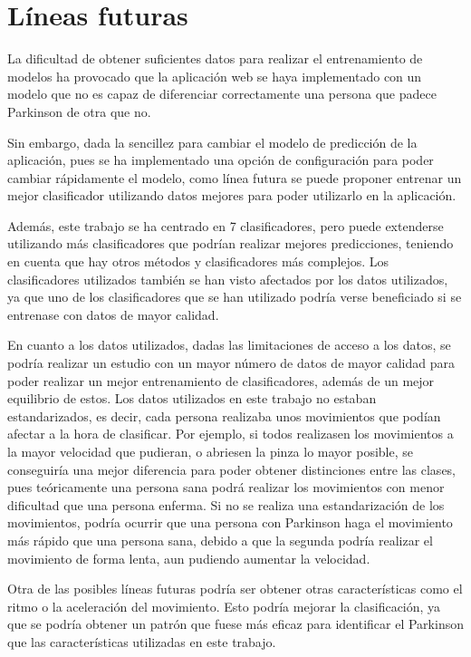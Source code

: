  \section{Líneas futuras}
 La dificultad de obtener suficientes datos para realizar el entrenamiento de modelos ha provocado que la aplicación web se haya implementado con un modelo que no es capaz de diferenciar correctamente una persona que padece Parkinson de otra que no.
 
 Sin embargo, dada la sencillez para cambiar el modelo de predicción de la aplicación, pues se ha implementado una opción de configuración para poder cambiar rápidamente el modelo, como línea futura se puede proponer entrenar un mejor clasificador utilizando datos mejores para poder utilizarlo en la aplicación.
 
 Además, este trabajo se ha centrado en 7 clasificadores, pero puede extenderse utilizando más clasificadores que podrían realizar mejores predicciones, teniendo en cuenta que hay otros métodos y clasificadores más complejos. Los clasificadores utilizados también se han visto afectados por los datos utilizados, ya que uno de los clasificadores que se han utilizado podría verse beneficiado si se entrenase con datos de mayor calidad. 
 
 En cuanto a los datos utilizados, dadas las limitaciones de acceso a los datos, se podría realizar un estudio con un mayor número de datos de mayor calidad para poder realizar un mejor entrenamiento de clasificadores, además de un mejor equilibrio de estos. Los datos utilizados en este trabajo no estaban estandarizados, es decir, cada persona realizaba unos movimientos que podían afectar a la hora de clasificar. Por ejemplo, si todos realizasen los movimientos a la mayor velocidad que pudieran, o abriesen la pinza lo mayor posible, se conseguiría una mejor diferencia para poder obtener distinciones entre las clases, pues teóricamente una persona sana podrá realizar los movimientos con menor dificultad que una persona enferma. Si no se realiza una estandarización de los movimientos, podría ocurrir que una persona con Parkinson haga el movimiento más rápido que una persona sana, debido a que la segunda podría realizar el movimiento de forma lenta, aun pudiendo aumentar la velocidad.
 
 Otra de las posibles líneas futuras podría ser obtener otras características como el ritmo o la aceleración del movimiento. Esto podría mejorar la clasificación, ya que se podría obtener un patrón que fuese más eficaz para identificar el Parkinson que las características utilizadas en este trabajo.
